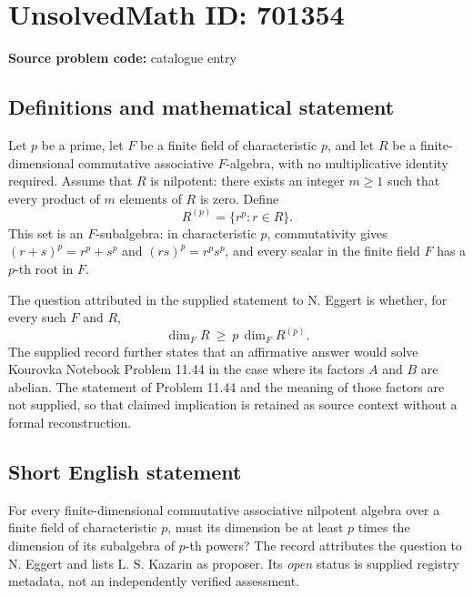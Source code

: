 \documentclass[11pt]{article}
\begin{document}
\section*{UnsolvedMath ID: 701354}
\textbf{Source problem code:} catalogue entry
\subsection{Definitions and mathematical statement}
Let \(p\) be a prime, let \(F\) be a finite field of characteristic \(p\), and let \(R\) be a finite-dimensional commutative associative \(F\)-algebra, with no multiplicative identity required. Assume that \(R\) is nilpotent: there exists an integer \(m\geq 1\) such that every product of \(m\) elements of \(R\) is zero. Define
\[
R^{(p)}=\{r^p:r\in R\}.
\]
This set is an \(F\)-subalgebra: in characteristic \(p\), commutativity gives \((r+s)^p=r^p+s^p\) and \((rs)^p=r^ps^p\), and every scalar in the finite field \(F\) has a \(p\)-th root in \(F\).

The question attributed in the supplied statement to N. Eggert is whether, for every such \(F\) and \(R\),
\[
\dim_F R\ \geq\ p\,\dim_F R^{(p)}.
\]
The supplied record further states that an affirmative answer would solve Kourovka Notebook Problem 11.44 in the case where its factors \(A\) and \(B\) are abelian. The statement of Problem 11.44 and the meaning of those factors are not supplied, so that claimed implication is retained as source context without a formal reconstruction.
\subsection{Short English statement}
For every finite-dimensional commutative associative nilpotent algebra over a finite field of characteristic \(p\), must its dimension be at least \(p\) times the dimension of its subalgebra of \(p\)-th powers? The record attributes the question to N. Eggert and lists L. S. Kazarin as proposer. Its \emph{open} status is supplied registry metadata, not an independently verified assessment.
\end{document}
